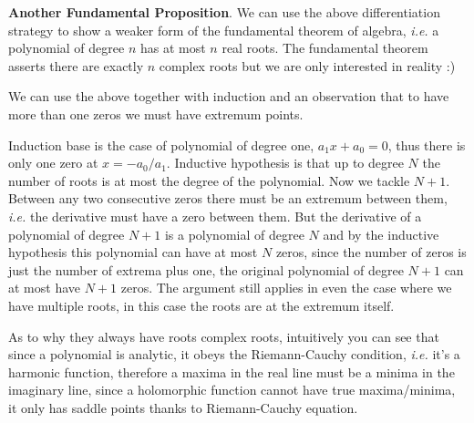 \documentclass[aps,preprint,preprintnumbers,nofootinbib,showpacs,prd]{revtex4-1}
\newcommand{\ie}{{\it i.e.} }
\begin{document}
{\bf Another Fundamental Proposition}. We can use the above differentiation strategy to show a weaker form of the fundamental theorem of algebra, \ie a polynomial of degree $n$ has at most $n$ real roots. The fundamental theorem asserts there are exactly $n$ complex roots but we are only interested in reality :)

We can use the above together with induction and an observation that to have more than one zeros we must have extremum points.

Induction base is the case of polynomial of degree one, $a_1 x + a_0 = 0$, thus there is only one zero at $x = -a_0/a_1$. Inductive hypothesis is that up to degree $N$ the number of roots is at most the degree of the polynomial. Now we tackle $N+1$. Between any two consecutive zeros there must be an extremum between them, \ie the derivative must have a zero between them. But the derivative of a polynomial of degree $N+1$ is a polynomial of degree $N$ and by the inductive hypothesis this polynomial can have at most $N$ zeros, since the number of zeros is just the number of extrema plus one, the original polynomial of degree $N+1$ can at most have $N+1$ zeros. The argument still applies in even the case where we have multiple roots, in this case the roots are at the extremum itself.

As to why they always have roots complex roots, intuitively you can see that since a polynomial is analytic, it obeys the Riemann-Cauchy condition, \ie it's a harmonic function, therefore a maxima in the real line must be a minima in the imaginary line, since a holomorphic function cannot have true maxima/minima, it only has saddle points thanks to Riemann-Cauchy equation.
\end{document}

